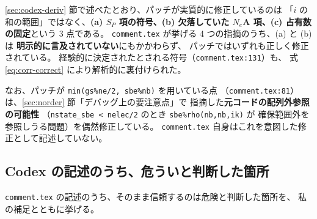 \documentclass[dvipdfmx,a4paper,11pt]{jsarticle}
\newcommand{\file}[1]{\texttt{#1}}
\newcommand{\vA}{\bm{A}}
\begin{document}
\ref{sec:codex-deriv} 節で述べたとおり、パッチが実質的に修正しているのは
「$i$ の和の範囲」ではなく、\textbf{(a) $S_P$ 項の符号、(b) 欠落していた
$N_e\vA$ 項、(c) 占有数の固定}という 3 点である。
\file{comment.tex} が挙げる 4 つの指摘のうち、(a) と (b) は
\textbf{明示的に言及されていない}にもかかわらず、
パッチではいずれも正しく修正されている。
経験的に決定されたとされる符号（\file{comment.tex:131}）も、
式 \eqref{eq:corr-correct} により解析的に裏付けられた。

なお、パッチが \verb|min(gs%ne/2, sbe%nb)| を用いている点
（\file{comment.tex:81}）は、\ref{sec:norder} 節「デバッグ上の要注意点」で
指摘した\textbf{元コードの配列外参照の可能性}
（\file{nstate\_sbe < nelec/2} のとき \file{sbe\%rho(nb,nb,ik)} が
確保範囲外を参照しうる問題）を偶然修正している。
\file{comment.tex} 自身はこれを意図した修正として記述していない。

\subsection{Codex の記述のうち、危ういと判断した箇所}
\label{sec:codex-risky}

\file{comment.tex} の記述のうち、そのまま信頼するのは危険と判断した箇所を、
私の補足とともに挙げる。
\end{document}
